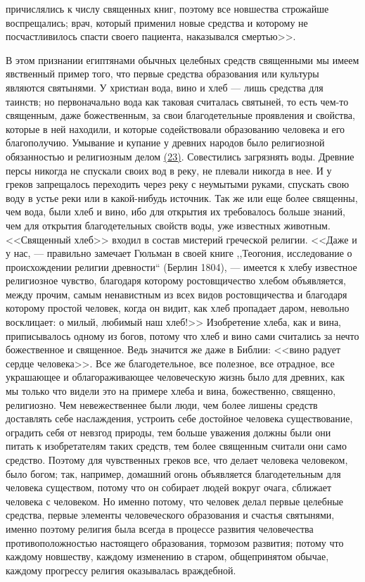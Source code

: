 \documentclass[12pt]{article}
\begin{document}
причислялись к числу священных книг, поэтому все новшества строжайше воспрещались; врач, который применил новые средства и которому не посчастливилось спасти своего пациента, наказывался смертью>>. 

В этом признании египтянами обычных целебных средств священными мы имеем явственный пример того, что первые средства образования или культуры являются святынями. У христиан вода, вино и хлеб --- лишь средства для таинств; но первоначально вода как таковая считалась святыней, то есть чем-то священным, даже божественным, за свои благодетельные проявления и свойства, которые в ней находили, и которые содействовали образованию человека и его благополучию. Умывание и купание у древних народов было религиозной обязанностью и религиозным делом \hyperlink{23}{(23)}\hypertarget{b23}{}. Совестились загрязнять воды. Древние персы никогда не спускали своих вод в реку, не плевали никогда в нее. И у греков запрещалось переходить через реку с неумытыми руками, спускать свою воду в устье реки или в какой-нибудь источник. Так же или еще более священны, чем вода, были хлеб и вино, ибо для открытия их требовалось больше знаний, чем для открытия благодетельных свойств воды, уже известных животным. <<Священный хлеб>> входил в состав мистерий греческой религии. <<Даже и у нас, --- правильно замечает Гюльман в своей книге ,,Теогония, исследование о происхождении религии древности`` (Берлин 1804), --- имеется к хлебу известное религиозное чувство, благодаря которому ростовщичество хлебом объявляется, между прочим, самым ненавистным из всех видов ростовщичества и благодаря которому простой человек, когда он видит, как хлеб пропадает даром, невольно восклицает: о милый, любимый наш хлеб!>> Изобретение хлеба, как и вина, приписывалось одному из богов, потому что хлеб и вино сами считались за нечто божественное и священное. Ведь значится же даже в Библии: <<вино радует сердце человека>>. Все же благодетельное, все полезное, все отрадное, все украшающее и облагораживающее человеческую жизнь было для древних, как мы только что видели это на примере хлеба и вина, божественно, священно, религиозно. Чем невежественнее были люди, чем более лишены средств доставлять себе наслаждения, устроить себе достойное человека существование, оградить себя от невзгод природы, тем больше уважения должны были они питать к изобретателям таких средств, тем более священным считали они само средство. Поэтому для чувственных греков все, что делает человека человеком, было богом; так, например, домашний огонь объявляется благодетельным для человека существом, потому что он собирает людей вокруг очага, сближает человека с человеком. Но именно потому, что человек делал первые целебные средства, первые элементы человеческого образования и счастья святынями, именно поэтому религия была всегда в процессе развития человечества противоположностью настоящего образования, тормозом развития; потому что каждому новшеству, каждому изменению в старом, общепринятом обычае, каждому прогрессу религия оказывалась враждебной. 
\end{document}
